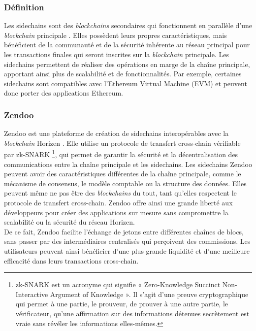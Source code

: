 \subsubsection{Définition}
Les sidechains sont des \textit{\gls{blockchain}s} secondaires qui fonctionnent en parallèle d'une \textit{\gls{blockchain}} principale \cite{jensen2021introduction,qin2018overview,belchior2022survey}. Elles possèdent leurs propres 
caractéristiques, mais bénéficient de la communauté et de la sécurité inhérente au réseau principal pour les transactions finales qui seront inscrites sur 
la \textit{\gls{blockchain}} principale. Les sidechains permettent de réaliser des opérations en marge de la chaîne principale, apportant ainsi plus de scalabilité 
et de fonctionnalités. Par exemple, certaines sidechains sont compatibles avec l'Ethereum Virtual Machine (EVM) et peuvent donc porter des applications Ethereum.

\subsubsection{Zendoo}
Zendoo est une plateforme de création de sidechains interopérables avec la \textit{\gls{blockchain}} Horizen \cite{garoffolo2020zendoo,belchior2022survey}. Elle utilise un protocole 
de transfert cross-chain vérifiable par zk-SNARK \footnote{zk-SNARK est un acronyme qui signifie « Zero-Knowledge Succinct Non-Interactive Argument of Knowledge ». 
Il s'agit d'une preuve cryptographique qui permet à une partie, le prouveur, de prouver à une autre partie, le vérificateur, qu'une affirmation sur des informations 
détenues secrètement est vraie sans révéler les informations elles-mêmes.}, qui permet de garantir la sécurité et la décentralisation des communications entre 
la chaîne principale et les sidechains. Les sidechains Zendoo peuvent avoir des caractéristiques différentes de la chaîne principale, comme le mécanisme de 
consensus, le modèle comptable ou la structure des données. Elles peuvent même ne pas être des \textit{\gls{blockchain}s} du tout, tant qu'elles respectent le protocole 
de transfert cross-chain. Zendoo offre ainsi une grande liberté aux développeurs pour créer des applications sur mesure sans compromettre la scalabilité ou la 
sécurité du réseau Horizen.\\
De ce fait, Zendoo facilite l'échange de jetons entre différentes chaînes de blocs, sans passer par des intermédiaires centralisés qui perçoivent des commissions. 
Les utilisateurs peuvent ainsi bénéficier d'une plus grande liquidité et d'une meilleure efficacité dans leurs transactions cross-chain.

